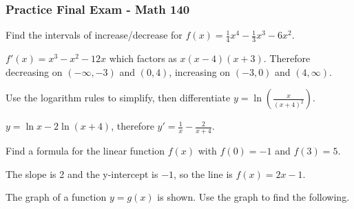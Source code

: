 \documentclass[12pt,answers]{exam}
\newcommand{\ds}{\displaystyle}
\begin{document}
\pagestyle{empty}
\subsubsection*{Practice Final Exam - Math 140 }
\begin{questions}

\question Find the intervals of increase/decrease for $f(x) = \frac{1}{4}x^4 - \frac{1}{3}x^3 - 6 x^{2}$.
\begin{solution}
$f'(x) = x^3 - x^2 - 12x$ which factors as $x(x-4)(x+3)$.  Therefore decreasing on $(-\infty,-3)$ and $(0,4)$, increasing on $(-3,0)$ and $(4,\infty)$.
\end{solution}
\vfill

\question Use the logarithm rules to simplify, then differentiate $\ds y= \ln \left( \frac{x}{(x+4)^2} \right)$.  
\begin{solution}
$\ds y = \ln x - 2 \ln (x+4)$, therefore $\ds y' = \frac{1}{x} - \frac{2}{x+4}$. 
\end{solution}
\vfill


\question Find a formula for the linear function $f(x)$ with $f(0) = -1$ and $f(3) = 5$.  
\begin{solution}
The slope is 2 and the y-intercept is $-1$, so the line is $f(x) = 2x-1$.
\end{solution}
\vfill


\question The graph of a function $y = g(x)$ is shown.  Use the graph to find the following.

\noindent
\begin{minipage}{0.4\textwidth}
\end{minipage}
\end{questions}
\end{document}

